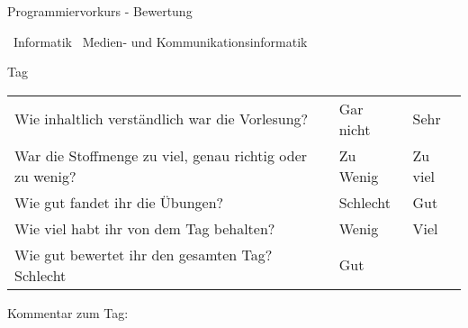 \documentclass[final,a4paper]{article}
\newcommand{\questionbox}{\fbox{\color{white}|~}~}
\begin{document}
\lstset{tabsize=4}
\lstset{basicstyle=\small}
\lstset{language=java}

{\huge Programmiervorkurs - Bewertung}

\bigskip

\questionbox Informatik \questionbox Medien- und Kommunikationsinformatik

\bigskip

Tag \questionbox

\bigskip

\begin{tabular}{ll@{~\questionbox\questionbox\questionbox\questionbox\questionbox~}l}
\baselineskip20pt
Wie inhaltlich verständlich war die Vorlesung? & Gar nicht & Sehr \\
War die Stoffmenge zu viel, genau richtig oder zu wenig? & Zu Wenig & Zu viel \\
Wie gut fandet ihr die Übungen? & Schlecht & Gut \\
Wie viel habt ihr von dem Tag behalten? & Wenig & Viel \\
Wie gut bewertet ihr den gesamten Tag? Schlecht & Gut \\
\end{tabular}

Kommentar zum Tag:
\fbox{
\begin{minipage}
\hfill
\vfill
\end{minipage}
}
\bigskip
\end{document}
